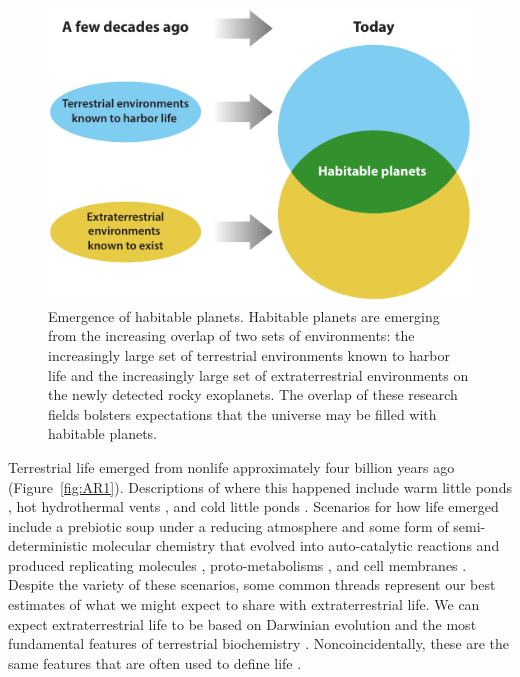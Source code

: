 \begin{figure}[!hbt]
	\centering
	\includegraphics[width=1\linewidth]{figures/AnnRevs/AR2.pdf}
	\caption[Emergence of habitable planets.]{Emergence of habitable planets. Habitable planets are emerging from the increasing overlap of two sets of environments: the increasingly large set of terrestrial environments known to harbor life and the increasingly large set of extraterrestrial environments on the newly detected rocky exoplanets. The overlap of these research fields bolsters expectations that the universe may be filled with habitable planets.}
	\label{fig:AR2}
\end{figure}

Terrestrial life emerged from nonlife approximately four billion years ago \citep{Battistuzzi2004,Sleep2008} (Figure~\ref{fig:AR1}). Descriptions of where this happened include warm little ponds \citep{Darwin1871}, hot hydrothermal vents \citep{Wachtershauser2006, Martin2008}, and cold little ponds \citep{Bada1994}. Scenarios for how life emerged include a prebiotic soup under a reducing atmosphere \citep{Oparin1924, Miller1953} and some form of semi-deterministic molecular chemistry \citep{Dyson1999, Segre2000} that evolved into auto-catalytic reactions \citep{Eigen1971} and produced replicating molecules \citep{Cairns-Smith1982, Gesteland1999}, proto-metabolisms \citep{Pascal2006}, and cell membranes \citep{Deamer2010}. Despite the variety of these scenarios, some common threads represent our best estimates of what we might expect to share with extraterrestrial life. We can expect extraterrestrial life to be based on Darwinian evolution and the most fundamental features of terrestrial biochemistry \citep{Feinberg1978, Pace2001, Morris2003, Benner2004, DeDuve2007, Lineweaver2012}. Noncoincidentally, these are the same features that are often used to define life \citep[\eg][]{Schrodinger1944, Sagan1970, Joyce1994, Leach2006}.
 
